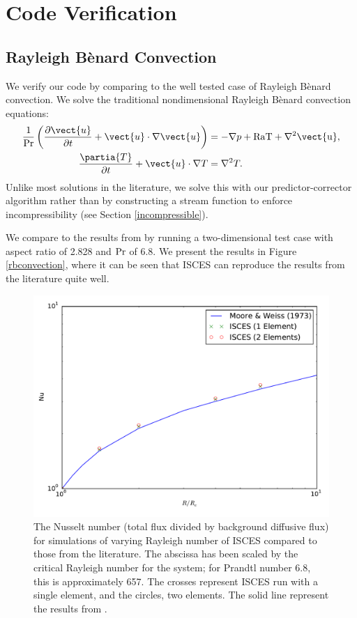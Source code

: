 \section{Code Verification} %
\label{sec:code_verification}

	\subsection{Rayleigh B\`enard Convection} %
	\label{sub:rayleigh_b_enard_convection}
	
		We verify our code by comparing to the well tested case of Rayleigh B\`enard convection.
			We solve the traditional nondimensional Rayleigh B\`enard convection equations:
			\begin{align}
				\frac{1}{\rm{Pr}}\left(\frac{\partial{\vect{u}}}{\partial{t}}+\vect{u}\cdot\nabla{\vect{u}}\right)&=-\nabla{p}+\rm{Ra}T+\nabla^{2}\vect{u},\\
				\frac{\partia{T}}{\partial{t}}+\vect{u}\cdot\nabla{T}&=\nabla^{2}T.
			\end{align}
			Unlike most solutions in the literature, we solve this with our predictor-corrector algorithm rather than by constructing a stream function to enforce incompressibility (see Section \ref{incompressible}).
		
		We compare to the results from \citet{Moore1973} by running a two-dimensional test case with aspect ratio of 2.828 and $\rm{Pr}$ of 6.8.
			We present the results in Figure \ref{rbconvection}, where it can be seen that ISCES can reproduce the results from the literature quite well.
			
		\begin{figure}[h]
		  \centering
		    \includegraphics[width=.9\textwidth]{../figs/verify.pdf}
		  \caption{The Nusselt number (total flux divided by background diffusive flux) for simulations of varying Rayleigh number of ISCES compared to those from the literature. The abscissa has been scaled by the critical Rayleigh number for the system; for Prandtl number 6.8, this is approximately 657. The crosses represent ISCES run with a single element, and the circles, two elements. The solid line represent the results from \citet{Moore1973}.}
		  \label{fig:figs_verify}
		\end{figure}
	

